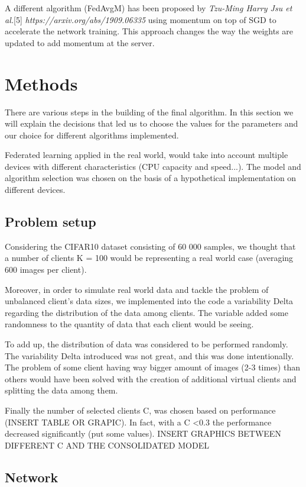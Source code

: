\documentclass[twocolumn]{article}
\begin{document}
A different algorithm (FedAvgM) has been proposed by \emph{Tzu-Ming Harry Jsu et al.}[5] \emph{https://arxiv.org/abs/1909.06335} using momentum on top of SGD to accelerate the network training. This approach changes the way the weights are updated to add momentum at the server.

\section{Methods} %
There are various steps in the building of the final algorithm. In this section we will explain the decisions that led us to choose the values for the parameters and our choice for different algorithms implemented. 

Federated learning applied in the real world, would take into account multiple devices with different characteristics (CPU capacity and speed...). The model and algorithm selection was chosen on the basis of a hypothetical implementation on different devices.  

\subsection{Problem setup}
Considering the CIFAR10 dataset consisting of 60 000 samples, we thought that a number of clients K = 100 would be representing a real world case (averaging 600 images per client). 

Moreover, in order to simulate real world data and tackle the problem of unbalanced client's data sizes, we implemented into the code a variability Delta regarding the distribution of the data among clients. The variable added some randomness to the quantity of data that each client would be seeing. 

To add up, the distribution of data was considered to be performed randomly. The variability Delta introduced was not great, and this was done intentionally. The problem of some client having way bigger amount of images (2-3 times) than others would have been solved with the creation of additional virtual clients and splitting the data among them. 

Finally the number of selected clients C, was chosen based on performance (INSERT TABLE OR GRAPIC). In fact, with a C <0.3 the performance decreased significantly (put some values).
INSERT GRAPHICS BETWEEN DIFFERENT C AND THE CONSOLIDATED MODEL

\subsection{Network}
\end{document}
